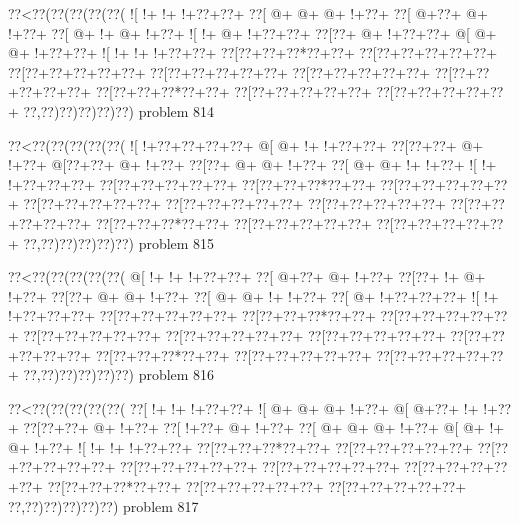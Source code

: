 \vbox{\vbox{\goo
\0??<\0??(\0??(\0??(\0??(\0??(
\- ![\- !+\- !+\- !+\0??+\0??+
\0??[\- @+\- @+\- @+\- !+\0??+
\0??[\- @+\0??+\- @+\- !+\0??+
\0??[\- @+\- !+\- @+\- !+\0??+
\- ![\- !+\- @+\- !+\0??+\0??+
\0??[\0??+\- @+\- !+\0??+\0??+
\- @[\- @+\- @+\- !+\0??+\0??+
\- ![\- !+\- !+\- !+\0??+\0??+
\0??[\0??+\0??+\0??*\0??+\0??+
\0??[\0??+\0??+\0??+\0??+\0??+
\0??[\0??+\0??+\0??+\0??+\0??+
\0??[\0??+\0??+\0??+\0??+\0??+
\0??[\0??+\0??+\0??+\0??+\0??+
\0??[\0??+\0??+\0??+\0??+\0??+
\0??[\0??+\0??+\0??*\0??+\0??+
\0??[\0??+\0??+\0??+\0??+\0??+
\0??[\0??+\0??+\0??+\0??+\0??+
\0??,\0??)\0??)\0??)\0??)\0??)
}
\hfil problem 814\hfil\break
}

\vbox{\vbox{\goo
\0??<\0??(\0??(\0??(\0??(\0??(
\- ![\- !+\0??+\0??+\0??+\0??+
\- @[\- @+\- !+\- !+\0??+\0??+
\0??[\0??+\0??+\- @+\- !+\0??+
\- @[\0??+\0??+\- @+\- !+\0??+
\0??[\0??+\- @+\- @+\- !+\0??+
\0??[\- @+\- @+\- !+\- !+\0??+
\- ![\- !+\- !+\0??+\0??+\0??+
\0??[\0??+\0??+\0??+\0??+\0??+
\0??[\0??+\0??+\0??*\0??+\0??+
\0??[\0??+\0??+\0??+\0??+\0??+
\0??[\0??+\0??+\0??+\0??+\0??+
\0??[\0??+\0??+\0??+\0??+\0??+
\0??[\0??+\0??+\0??+\0??+\0??+
\0??[\0??+\0??+\0??+\0??+\0??+
\0??[\0??+\0??+\0??*\0??+\0??+
\0??[\0??+\0??+\0??+\0??+\0??+
\0??[\0??+\0??+\0??+\0??+\0??+
\0??,\0??)\0??)\0??)\0??)\0??)
}
\hfil problem 815\hfil\break
}

\vbox{\vbox{\goo
\0??<\0??(\0??(\0??(\0??(\0??(
\- @[\- !+\- !+\- !+\0??+\0??+
\0??[\- @+\0??+\- @+\- !+\0??+
\0??[\0??+\- !+\- @+\- !+\0??+
\0??[\0??+\- @+\- @+\- !+\0??+
\0??[\- @+\- @+\- !+\- !+\0??+
\0??[\- @+\- !+\0??+\0??+\0??+
\- ![\- !+\- !+\0??+\0??+\0??+
\0??[\0??+\0??+\0??+\0??+\0??+
\0??[\0??+\0??+\0??*\0??+\0??+
\0??[\0??+\0??+\0??+\0??+\0??+
\0??[\0??+\0??+\0??+\0??+\0??+
\0??[\0??+\0??+\0??+\0??+\0??+
\0??[\0??+\0??+\0??+\0??+\0??+
\0??[\0??+\0??+\0??+\0??+\0??+
\0??[\0??+\0??+\0??*\0??+\0??+
\0??[\0??+\0??+\0??+\0??+\0??+
\0??[\0??+\0??+\0??+\0??+\0??+
\0??,\0??)\0??)\0??)\0??)\0??)
}
\hfil problem 816\hfil\break
}

\vbox{\vbox{\goo
\0??<\0??(\0??(\0??(\0??(\0??(
\0??[\- !+\- !+\- !+\0??+\0??+
\- ![\- @+\- @+\- @+\- !+\0??+
\- @[\- @+\0??+\- !+\- !+\0??+
\0??[\0??+\0??+\- @+\- !+\0??+
\0??[\- !+\0??+\- @+\- !+\0??+
\0??[\- @+\- @+\- @+\- !+\0??+
\- @[\- @+\- !+\- @+\- !+\0??+
\- ![\- !+\- !+\- !+\0??+\0??+
\0??[\0??+\0??+\0??*\0??+\0??+
\0??[\0??+\0??+\0??+\0??+\0??+
\0??[\0??+\0??+\0??+\0??+\0??+
\0??[\0??+\0??+\0??+\0??+\0??+
\0??[\0??+\0??+\0??+\0??+\0??+
\0??[\0??+\0??+\0??+\0??+\0??+
\0??[\0??+\0??+\0??*\0??+\0??+
\0??[\0??+\0??+\0??+\0??+\0??+
\0??[\0??+\0??+\0??+\0??+\0??+
\0??,\0??)\0??)\0??)\0??)\0??)
}
\hfil problem 817\hfil\break
}

